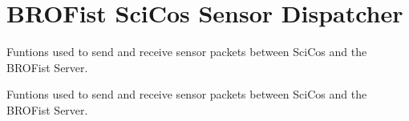 \hypertarget{group___b_r_o_cos_sens_dispatcher}{
\section{BROFist SciCos Sensor Dispatcher}
\label{group___b_r_o_cos_sens_dispatcher}
}


Funtions used to send and receive sensor packets between SciCos and the BROFist Server.  


Funtions used to send and receive sensor packets between SciCos and the BROFist Server. 